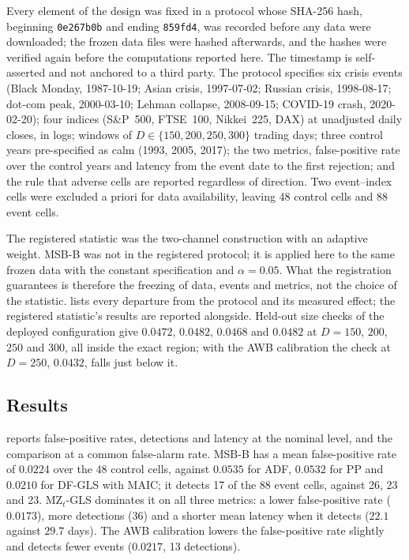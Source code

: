 \documentclass[11pt]{article}
\newcommand{\RMGLS}{MSB-B}
\begin{document}
Every element of the design was fixed in a protocol whose SHA-256
hash, beginning \texttt{0e267b0b} and ending \texttt{859fd4}, was recorded before any data were
downloaded; the frozen data files were hashed afterwards, and the hashes
were verified again before the computations reported here. The
timestamp is self-asserted and not anchored to a third party. The
protocol specifies six crisis events (Black Monday, 1987-10-19; Asian
crisis, 1997-07-02; Russian crisis, 1998-08-17; dot-com peak, 2000-03-10;
Lehman collapse, 2008-09-15; COVID-19 crash, 2020-02-20); four indices
(S\&P~500, FTSE~100, Nikkei~225, DAX) at unadjusted daily closes, in
logs; windows of $D \in \{150, 200, 250, 300\}$ trading days; three
control years pre-specified as calm (1993, 2005, 2017); the two metrics,
false-positive rate over the control years and latency from the event
date to the first rejection; and the rule that adverse cells are
reported regardless of direction. Two event--index cells were excluded a
priori for data availability, leaving 48 control cells and 88 event
cells.

The registered statistic was the two-channel construction with an
adaptive weight. \RMGLS{} was not in the registered protocol; it is
applied here to the same frozen data with the constant specification and
$\alpha = 0.05$. What the registration guarantees is therefore the
freezing of data, events and metrics, not the choice of the statistic.
 lists every departure from the protocol and its
measured effect; the registered statistic's results are reported
alongside. Held-out size checks of the deployed configuration give
$0.0472$, $0.0482$, $0.0468$ and $0.0482$ at $D = 150$, $200$, $250$ and
$300$, all inside the exact region; with the AWB calibration the check at
$D = 250$, $0.0432$, falls just below it.

\subsection*{Results}

 reports false-positive rates, detections and latency at the
nominal level, and the comparison at a common false-alarm rate.
\RMGLS{} has a mean false-positive rate of $0.0224$ over the 48 control
cells, against $0.0535$ for ADF, $0.0532$ for PP and $0.0210$ for DF-GLS
with MAIC; it detects 17 of the 88 event cells, against 26, 23 and 23.
MZ$_t$-GLS dominates it on all three metrics: a lower false-positive
rate ($0.0173$), more detections (36) and a shorter mean latency when
it detects ($22.1$ against $29.7$ days). The AWB calibration lowers the
false-positive rate slightly and detects fewer events ($0.0217$, 13
detections).
\end{document}
